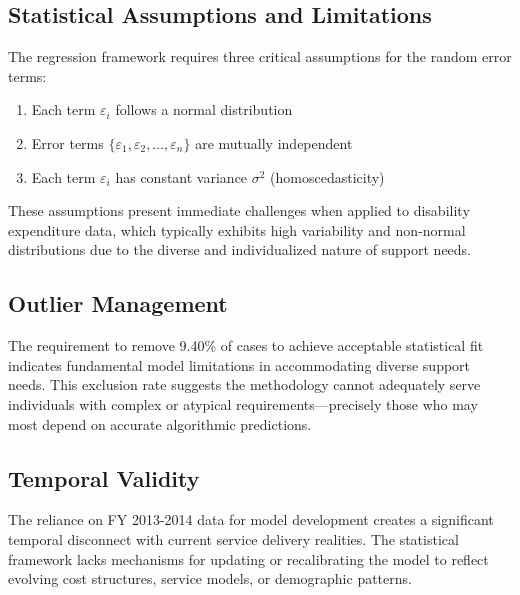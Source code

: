 \subsection{Statistical Assumptions and Limitations}

The regression framework requires three critical assumptions for the random error terms:

\begin{enumerate}
    \item Each term $\varepsilon_i$ follows a normal distribution
    \item Error terms $\{\varepsilon_1, \varepsilon_2, \ldots, \varepsilon_n\}$ are mutually independent
    \item Each term $\varepsilon_i$ has constant variance $\sigma^2$ (homoscedasticity)
\end{enumerate}

These assumptions present immediate challenges when applied to disability expenditure data, which typically exhibits high variability and non-normal distributions due to the diverse and individualized nature of support needs.

\subsection{Outlier Management}
The requirement to remove 9.40\% of cases to achieve acceptable statistical fit indicates fundamental model limitations in accommodating diverse support needs. This exclusion rate suggests the methodology cannot adequately serve individuals with complex or atypical requirements—precisely those who may most depend on accurate algorithmic predictions.

\subsection{Temporal Validity}
The reliance on FY 2013-2014 data for model development creates a significant temporal disconnect with current service delivery realities. The statistical framework lacks mechanisms for updating or recalibrating the model to reflect evolving cost structures, service models, or demographic patterns.

